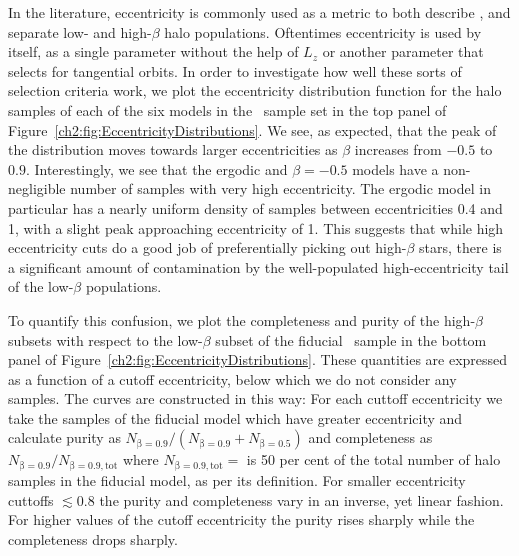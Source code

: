 In the literature, eccentricity is commonly used as a metric to both describe \parencite{myeong19,mackereth19a}, and separate \parencite{mackereth20,naidu20} low- and high-$\beta$ halo populations. Oftentimes eccentricity is used by itself, as a single parameter without the help of $L_{z}$ or another parameter that selects for tangential orbits. In order to investigate how well these sorts of selection criteria work, we plot the eccentricity distribution function for the halo samples of each of the six models in the \survey\ sample set in the top panel of Figure~\ref{ch2:fig:EccentricityDistributions}. We see, as expected, that the peak of the distribution moves towards larger eccentricities as $\beta$ increases from $-0.5$ to $0.9$. Interestingly, we see that the ergodic and $\beta=-0.5$ models have a non-negligible number of samples with very high eccentricity. The ergodic model in particular has a nearly uniform density of samples between eccentricities 0.4 and 1, with a slight peak approaching eccentricity of 1. This suggests that while high eccentricity cuts do a good job of preferentially picking out high-$\beta$ stars, there is a significant amount of contamination by the well-populated high-eccentricity tail of the low-$\beta$ populations.



To quantify this confusion, we plot the completeness and purity of the high-$\beta$ subsets with respect to the low-$\beta$ subset of the fiducial \survey\ sample in the bottom panel of Figure~\ref{ch2:fig:EccentricityDistributions}. These quantities are expressed as a function of a cutoff eccentricity, below which we do not consider any samples. The curves are constructed in this way: For each cuttoff eccentricity we take the samples of the fiducial model which have greater eccentricity and calculate purity as $N_\mathrm{\beta=0.9}/(N_\mathrm{\beta=0.9}+N_\mathrm{\beta=0.5})$ and completeness as $N_\mathrm{\beta=0.9}/N_\mathrm{\beta=0.9,tot}$ where $N_\mathrm{\beta=0.9,tot}=$ is 50 per cent of the total number of halo samples in the fiducial model, as per its definition. For smaller eccentricity cuttoffs $\lesssim 0.8$ the purity and completeness vary in an inverse, yet linear fashion. For higher values of the cutoff eccentricity the purity rises sharply while the completeness drops sharply.

